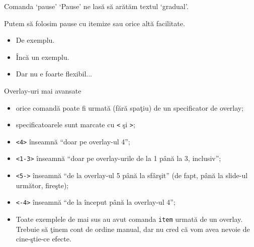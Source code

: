 \documentclass{beamer}
\begin{document}
\begin{frame}{Comanda `pause'}
  `Pause' ne lasă să arătăm textul `gradual'.

  \pause Putem să folosim pause cu itemize sau orice altă facilitate.
  \begin{itemize}
    \pause \item De exemplu.
    \pause \item Încă un exemplu.
    \pause \item Dar nu e foarte flexibil...
  \end{itemize}
\end{frame}

\begin{frame}{Overlay-uri mai avansate}
  \begin{itemize}
  \item<3-> orice comandă poate fi urmată (fără spaţiu) de un specificator de
    overlay;
  \item<4-> specificatoarele sunt marcate cu \texttt{<} şi \texttt{>};
  \item<5-> \texttt{<4>} înseamnă ``doar pe overlay-ul 4'';
  \item<5-> \texttt{<1-3>} înseamnă ``doar pe overlay-urile de la 1 până la 3,
    inclusiv'';
  \item<6-> \texttt{<5->} înseamnă ``de la overlay-ul 5 până la sfârşit'' (de
    fapt, până la slide-ul următor, fireşte);
  \item<6-> \texttt{<-4>} înseamnă ``de la început până la overlay-ul 4'';
  \item<7-> Toate exemplele de mai sus au avut comanda \texttt{item} urmată de
    un overlay. Trebuie să ţinem cont de ordine manual, dar nu cred că vom avea
    nevoie de cine-ştie-ce efecte.
  \end{itemize}
\end{frame}
\end{document}
